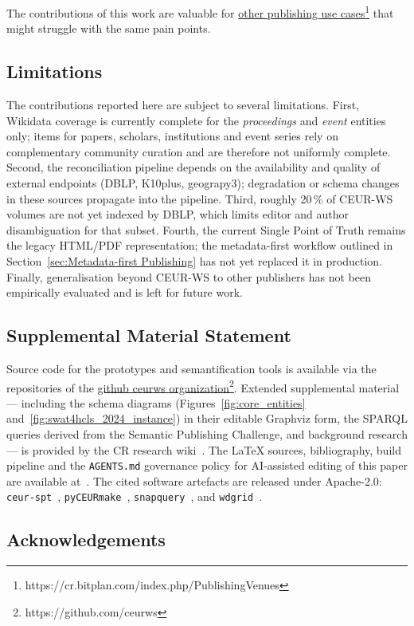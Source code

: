 \documentclass[runningheads]{llncs}
\newcommand{\footnotelink}[2]{\href{#1}{#2}\footnote{#1}}
\begin{document}
 The contributions of this work are valuable for  \footnotelink{https://cr.bitplan.com/index.php/PublishingVenues}{other publishing use cases} that might struggle with the same pain points.

\subsection{Limitations}\label{sec:Limitations}
The contributions reported here are subject to several limitations.
First, Wikidata coverage is currently complete for the \emph{proceedings}
and \emph{event} entities only; items for papers, scholars,
institutions and event series rely on complementary community
curation and are therefore not uniformly complete. Second, the
reconciliation pipeline depends on the availability and quality of
external endpoints (DBLP, K10plus, geograpy3); degradation or
schema changes in these sources propagate into the pipeline.
Third, roughly 20\,\% of CEUR-WS volumes are not yet indexed by
DBLP, which limits editor and author disambiguation for that subset.
Fourth, the current Single Point of Truth remains the legacy HTML/PDF
representation; the metadata-first workflow outlined in
Section~\ref{sec:Metadata-first Publishing} has not yet replaced it
in production. Finally, generalisation beyond CEUR-WS to other
publishers has not been empirically evaluated and is left for future
work.

\subsection{Supplemental Material Statement} Source code for the prototypes and semantification tools is available via the repositories of the
\footnotelink{https://github.com/ceurws}{github ceurws organization}. Extended supplemental material --- including the schema diagrams (Figures~\ref{fig:core_entities} and~\ref{fig:swat4hcls_2024_instance}) in their editable Graphviz form, the SPARQL queries derived from the Semantic Publishing Challenge, and background research --- is provided by the CR research wiki~\cite{Fahl_CR_Wiki}.
The LaTeX sources, bibliography, build pipeline and the \texttt{AGENTS.md} governance policy for AI-assisted editing of this paper are available at~\cite{CEURWSSemantificationISWC2026Repo}. The cited software artefacts are released under Apache-2.0: \texttt{ceur-spt}~\cite{ceur-spt}, \texttt{pyCEURmake}~\cite{pyCEURmake}, \texttt{snapquery}~\cite{snapquery}, and \texttt{wdgrid}~\cite{wdgrid}.
\subsection{Acknowledgements}
\label{sec:ack}
\end{document}
